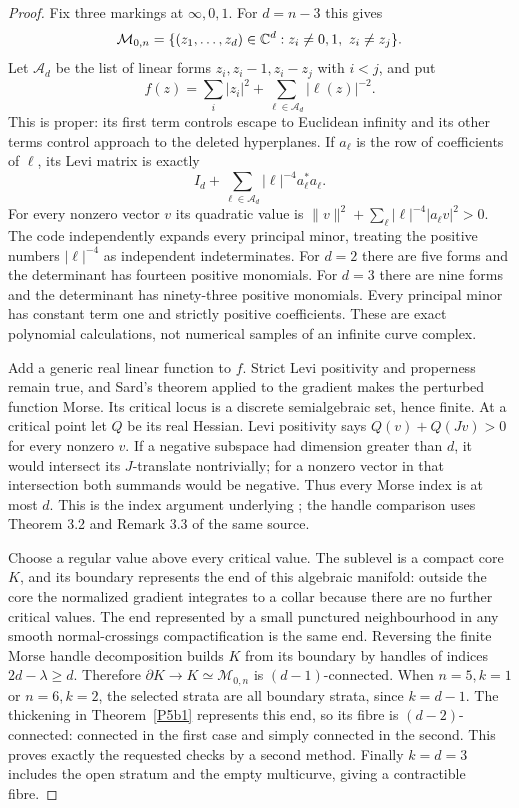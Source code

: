 \begin{proof}
Fix three markings at $\infty,0,1$.  For $d=n-3$ this gives
\[
 \mathcal M_{0,n}=\{(z_1,\ldots,z_d)\in\mathbb C^d:
 z_i\ne0,1,\ z_i\ne z_j\}.
\]
Let $\mathscr A_d$ be the list of linear forms $z_i,z_i-1,z_i-z_j$
with $i<j$, and put
\[
 f(z)=\sum_i|z_i|^2+\sum_{\ell\in\mathscr A_d}|\ell(z)|^{-2}.
\]
This is proper: its first term controls escape to Euclidean
infinity and its other terms control approach to the deleted
hyperplanes.  If $a_\ell$ is the row of coefficients of $\ell$,
its Levi matrix is exactly
\[
 I_d+\sum_{\ell\in\mathscr A_d}
       |\ell|^{-4}a_\ell^*a_\ell.
\]
For every nonzero vector $v$ its quadratic value is
$\|v\|^2+\sum_\ell|\ell|^{-4}|a_\ell v|^2>0$.
The code independently expands every principal minor, treating
the positive numbers $|\ell|^{-4}$ as independent indeterminates.
For $d=2$ there are five forms and the determinant has fourteen
positive monomials.  For $d=3$ there are nine forms and the
determinant has ninety-three positive monomials.  Every
principal minor has constant term one and strictly positive
coefficients.  These are exact polynomial calculations, not
numerical samples of an infinite curve complex.

Add a generic real linear function to $f$.  Strict Levi
positivity and properness remain true, and Sard's theorem
applied to the gradient makes the perturbed function Morse.
Its critical locus is a discrete semialgebraic set, hence
finite.  At a critical point let $Q$ be its real Hessian.  Levi
positivity says $Q(v)+Q(Jv)>0$ for every nonzero $v$.  If a
negative subspace had dimension greater than $d$, it would
intersect its $J$-translate nontrivially; for a nonzero vector
in that intersection both summands would be negative.  Thus
every Morse index is at most $d$.  This is the index argument
underlying \citet[Theorem 7.2]{Milnor1963}; the handle comparison
uses Theorem 3.2 and Remark 3.3 of the same source.

Choose a regular value above every critical value.  The
sublevel is a compact core $K$, and its boundary represents the
end of this algebraic manifold: outside the core the normalized
gradient integrates to a collar because there are no further
critical values.  The end represented by a small punctured
neighbourhood in any smooth normal-crossings compactification
is the same end.  Reversing the finite Morse handle decomposition
builds $K$ from its boundary by handles of indices
$2d-\lambda\ge d$.  Therefore $\partial K\to K\simeq
\mathcal M_{0,n}$ is $(d-1)$-connected.
When $n=5,k=1$ or $n=6,k=2$, the selected strata are all boundary
strata, since $k=d-1$.  The thickening in
Theorem~\ref{P5b1} represents this end, so its fibre is
$(d-2)$-connected: connected in the first case and simply
connected in the second.  This proves exactly the requested
checks by a second method.  Finally $k=d=3$ includes the open
stratum and the empty multicurve, giving a contractible fibre.
\end{proof}

